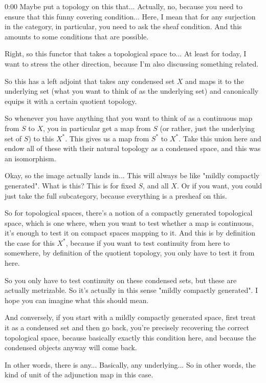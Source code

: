\begin{unfinished}{0:00}
Maybe put a topology on this that... Actually, no, because you need to ensure that this funny covering condition... Here, I mean that for any surjection in the category, in particular, you need to ask the sheaf condition. And this amounts to some conditions that are possible.

Right, so this functor that takes a topological space to... At least for today, I want to stress the other direction, because I'm also discussing something related.

So this has a left adjoint that takes any condensed set $X$ and maps it to the underlying set (what you want to think of as the underlying set) and canonically equips it with a certain quotient topology.

So whenever you have anything that you want to think of as a continuous map from $S$ to $X$, you in particular get a map from $S$ (or rather, just the underlying set of $S$) to this $X^*$. This gives us a map from $S^*$ to $X^*$. Take this union here and endow all of these with their natural topology as a condensed space, and this was an isomorphism.

Okay, so the image actually lands in... This will always be like "mildly compactly generated". What is this? This is for fixed $S$, and all $X$. Or if you want, you could just take the full subcategory, because everything is a presheaf on this.

So for topological spaces, there's a notion of a compactly generated topological space, which is one where, when you want to test whether a map is continuous, it's enough to test it on compact spaces mapping to it. And this is by definition the case for this $X^*$, because if you want to test continuity from here to somewhere, by definition of the quotient topology, you only have to test it from here.

So you only have to test continuity on these condensed sets, but these are actually metrizable. So it's actually in this sense "mildly compactly generated". I hope you can imagine what this should mean.

And conversely, if you start with a mildly compactly generated space, first treat it as a condensed set and then go back, you're precisely recovering the correct topological space, because basically exactly this condition here, and because the condensed objects anyway will come back.

In other words, there is any... Basically, any underlying... So in other words, the kind of unit of the adjunction map in this case.


\end{unfinished}
